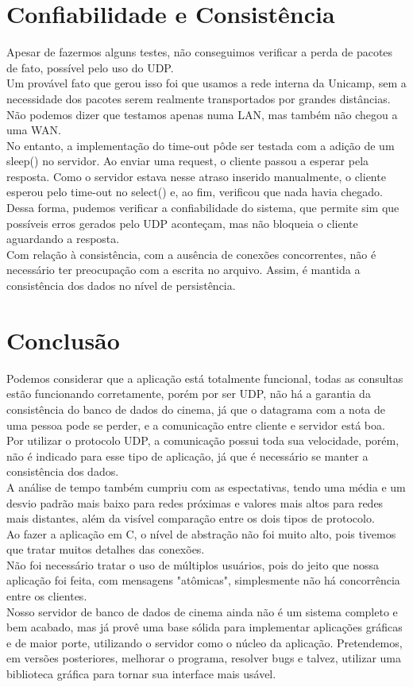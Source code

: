 \documentclass[11pt,twoside]{article}
\begin{document}
\section{Confiabilidade e Consistência}
Apesar de fazermos alguns testes, não conseguimos verificar a perda de pacotes de fato, possível pelo uso do UDP.\\
Um provável fato que gerou isso foi que usamos a rede interna da Unicamp, sem a necessidade dos pacotes serem realmente transportados por grandes distâncias. Não podemos dizer que testamos apenas numa LAN, mas também não chegou a uma WAN.\\
No entanto, a implementação do time-out pôde ser testada com a adição de um sleep() no servidor. Ao enviar uma request, o cliente passou a esperar pela resposta. Como o servidor estava nesse atraso inserido manualmente, o cliente esperou pelo time-out no select() e, ao fim, verificou que nada havia chegado.\\
Dessa forma, pudemos verificar a confiabilidade do sistema, que permite sim que possíveis erros gerados pelo UDP aconteçam, mas não bloqueia o cliente aguardando a resposta.\\
Com relação à consistência, com a ausência de conexões concorrentes, não é necessário ter preocupação com a escrita no arquivo. Assim, é mantida a consistência dos dados no nível de persistência.\\

\section{Conclusão}
Podemos considerar que a aplicação está totalmente funcional, todas as consultas estão funcionando corretamente, porém por ser UDP, não há a garantia da consistência do banco de dados do cinema, já que o datagrama com a nota de uma pessoa pode se perder, e a comunicação entre cliente e servidor está boa.\\
Por utilizar o protocolo UDP, a comunicação possui toda sua velocidade, porém, não é indicado para esse tipo de aplicação, já que é necessário se manter a consistência dos dados.\\
A análise de tempo também cumpriu com as espectativas, tendo uma média e um desvio padrão mais baixo para redes próximas e valores mais altos para redes mais distantes, além da visível comparação entre os dois tipos de protocolo.\\
Ao fazer a aplicação em C, o nível de abstração não foi muito alto, pois tivemos que tratar muitos detalhes das conexões.\\
Não foi necessário tratar o uso de múltiplos usuários, pois do jeito que nossa aplicação foi feita, com mensagens "atômicas", simplesmente não há concorrência entre os clientes.\\
Nosso servidor de banco de dados de cinema ainda não é um sistema completo e bem acabado, mas já provê uma base sólida para implementar aplicações gráficas e de maior porte, utilizando o servidor como o núcleo da aplicação. Pretendemos, em versões posteriores, melhorar o programa, resolver bugs e talvez, utilizar uma biblioteca gráfica para tornar sua interface mais usável. 
\end{document}

